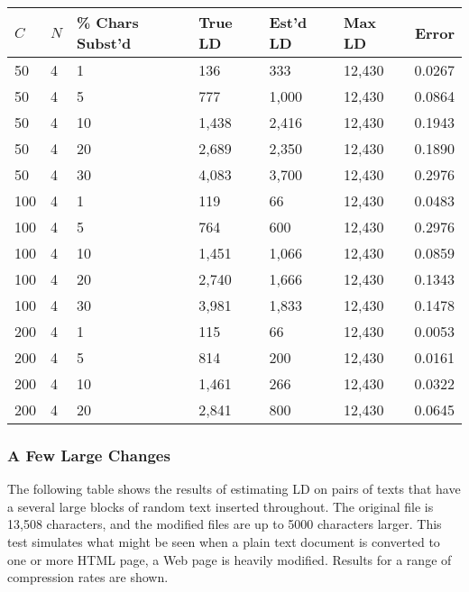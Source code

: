 \documentclass[html]{article}    %
\begin{document}
\vspace {10 mm}
\begin {tabular} {|l|l|l|l|l|l|r|} \hline \hline
 $C$ 	& $N$ & \% Chars Subst'd & True LD	& Est'd LD	& Max LD & Error \\
 \hline \hline
 
 50 	& 4  & 1 				& 136  		& 333 		& 12,430 &	0.0267	\\ \hline
 50 	& 4  & 5 				& 777  		& 1,000 	& 12,430 &	0.0864	\\ \hline
 50 	& 4  & 10 				& 1,438  	& 2,416 	& 12,430 &	0.1943	\\ \hline
 50 	& 4  & 20 				& 2,689 	& 2,350 	& 12,430 &	0.1890	\\ \hline
 50 	& 4  & 30 				& 4,083  	& 3,700 	& 12,430 &	0.2976	\\ \hline
 
 100 	& 4  & 1 				& 119  		& 66 		& 12,430 &	0.0483	\\ \hline
 100 	& 4  & 5  				& 764		& 600 		& 12,430 &	0.2976	\\ \hline
 100 	& 4  & 10 				& 1,451  	& 1,066		& 12,430 &	0.0859	\\ \hline
 100 	& 4  & 20 				& 2,740  	& 1,666 	& 12,430 &	0.1343	\\ \hline
 100 	& 4  & 30 				& 3,981  	& 1,833 	& 12,430 &	0.1478	\\ \hline
 
 200 	& 4  & 1	 			& 115  		& 66 		& 12,430 &	0.0053	\\ \hline
 200 	& 4  & 5	 			& 814  		& 200 		& 12,430 &	0.0161	\\ \hline
 200 	& 4  & 10 				& 1,461  	& 266 		& 12,430 &	0.0322	\\ \hline
 200 	& 4  & 20 				& 2,841  	& 800 		& 12,430 &	0.0645	\\ \hline
 
\end {tabular} 

\subsubsection{A Few Large Changes}
The following table shows the results of estimating LD  on pairs of texts that have a 
several large blocks of random text inserted throughout. 
The original file is 13,508 characters, and the modified files are up to 5000
characters larger. 
This test simulates what might be seen when a plain text
document is converted to one or more HTML page, a Web page is heavily
modified.
Results for a range of compression rates are shown.
\end{document}
